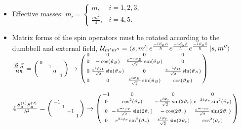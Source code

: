 \documentclass[aspectratio=169]{beamer}
\newcommand{\U}{\ensuremath{\mathbb{\cal U}}}
\renewcommand{\va}{\vec}
\newenvironment{psmallmatrix}
    {\left(\begin{smallmatrix}}
    {\end{smallmatrix}\right)}
\begin{document}
\begin{frame}
        \begin{itemize}
                \item{ Effective masses: \(
        m_i = \begin{cases}
                m, & i = 1, 2, 3,\\
                \frac{ml^2}{4}, & i = 4, 5.
        \end{cases}
\)}
\item Matrix forms of the spin operators must be rotated according to the dumbbell and
        external field, \(
        \U_{m'm''} = \bra{s,
        m'}e^{\frac{-iS_\mu\alpha}{\hbar}}e^{\frac{-iS_y\beta}{\hbar}}e^{\frac{-iS_\mu\delta}{\hbar{}}}\ket{s,
m''}\)
  \(\frac{\va{B}\cdot \va{S}}{B\hbar{}} =
        \begin{psmallmatrix}
                0& & & \\
                 &-1 & & \\
                 & & 0 &\\
                 & & & &1
        \end{psmallmatrix} \to \begin{psmallmatrix}
            0 & 0 & 0 & 0\\
            0 & -\cos(\vartheta_B) & \frac{e^{-i\varphi_B}}{\sqrt{2} }\sin(\vartheta_B) & 0\\
                    0 & \frac{e^{i\varphi_B}}{\sqrt{2} }\sin(\vartheta_B) & 0 &
                    \frac{e^{-i\varphi_B}}{\sqrt{2} }\sin(\vartheta_B)\\
                    0 & 0 & \frac{e^{i\varphi_B}}{\sqrt{2} }\sin(\vartheta_B) &
                    \cos(\vartheta_B)\end{psmallmatrix}
\)

\(4\frac{S^{(1)}_\mu S^{(2)}_\mu}{\hbar{}^{2}} =
        \begin{psmallmatrix} 
        -1& & & \\
         &1& & \\
         & &-1& \\
         & & &1
        \end{psmallmatrix}
        \to 
        \begin{psmallmatrix}-1 & 0 & 0 & 0\\
                0 & \cos[2](\vartheta_r) & -\frac{e^{i\varphi_r}}{\sqrt{2}
                }\sin(2\vartheta_r) & e^{-2i\varphi_r}\sin[2](\vartheta_r)\\
                0 & -\frac{e^{-i\varphi_r}}{\sqrt{2}
                }\sin(2\vartheta_r) & -\cos(2\vartheta_r) & \frac{e^{-i\varphi_r}}{\sqrt{2}
        }\sin(2\vartheta_r)\\
        0 & e^{2i\varphi_r}\sin[2](\vartheta_r) & \frac{e^{i\varphi_r}}{\sqrt{2}
        }\sin(2\vartheta_r) & \cos[2](\vartheta_r)
        \end{psmallmatrix}
        \)
        \end{itemize}
\end{frame}
\end{document}
